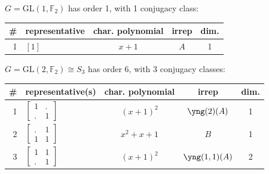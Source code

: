 \documentclass[11pt,oneside]{article}
\newcommand{\GL}{\mathrm{GL}}
\newcommand{\Field}{\mathbb{F}}
\begin{document}

\setlength{\tabcolsep}{10pt}
\setlength{\arraycolsep}{1pt}
\renewcommand{\arraystretch}{0.5}


$G=\GL(1,\Field_2)$ has order 1, with 1 conjugacy class:
\begin{center}
\begin{tabular}{r|l|c|c|c}
\# & representative & char. polynomial & irrep & dim. \\
\hline
1 & $[1]$           & $x+1$            & $A$   & 1    \\
\end{tabular}
\end{center}

$G=\GL(2,\Field_2) \cong S_3$ has order 6, with 3 conjugacy classes:
\begin{center}
\begin{tabular}{r|l|c|c|c}
\# & representative(s) & char. polynomial & irrep & dim. \\
\hline
1  & $\begin{bmatrix}1&.\\.&1\end{bmatrix}$    & $(x+1)^2$  & $\yng(2)(A)$  & 1 \\
2  & $\begin{bmatrix}.&1\\1&1\end{bmatrix}$     & $x^2+x+1$  &  $B$  & 1 \\
3  & $\begin{bmatrix}1&1\\.&1\end{bmatrix}$    & $(x+1)^2$  & $\yng(1,1)(A)$ & 2  \\
\end{tabular}
\end{center}
\end{document}
